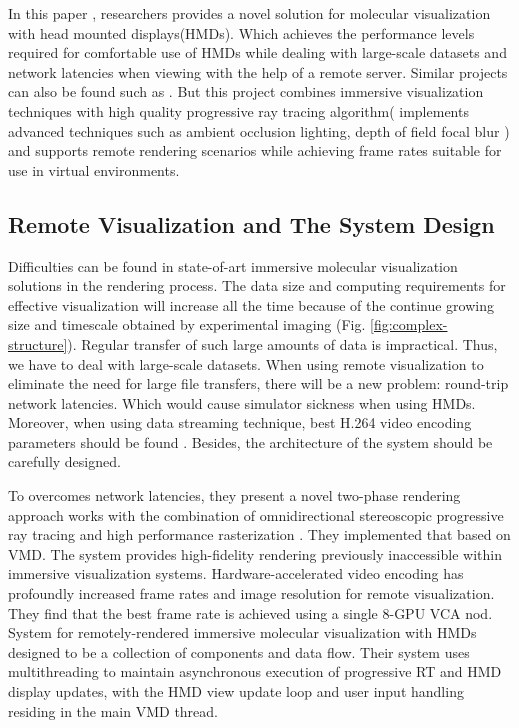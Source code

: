 \documentclass[10pt,twocolumn,letterpaper]{article}
\begin{document}
In this paper \cite{stone_immersive_2016}, researchers provides a novel solution for molecular visualization with head mounted displays(HMDs). Which achieves the performance levels required for comfortable use of HMDs while dealing with large-scale datasets and network latencies when viewing with the help of a remote server. Similar projects can also be found such as \cite{IMAX} \cite{Marsalek}. But this project combines immersive visualization techniques with high quality progressive ray tracing algorithm( implements advanced techniques such as ambient occlusion lighting, depth of field focal blur ) and supports remote rendering scenarios while achieving frame rates suitable for use in virtual environments. 

\subsection{Remote Visualization and The System Design}

Difficulties can be found in state-of-art immersive molecular visualization solutions in the rendering process. The data size and computing requirements for effective visualization will increase all the time because of the continue growing size and timescale obtained by experimental imaging (Fig. \ref{fig:complex-structure}). Regular transfer of such large amounts of data is impractical. Thus, we have to deal with large-scale datasets. When using remote visualization to eliminate the need for large file transfers, there will be a new problem: round-trip network latencies. Which would cause simulator sickness when using HMDs. Moreover, when using data streaming technique, best H.264 video encoding parameters should be found \cite{1218189}. Besides, the architecture of the system should be carefully designed.

To overcomes network latencies, they present a novel two-phase rendering approach works with the combination of omnidirectional stereoscopic progressive ray tracing and high performance rasterization \cite{hprsgpu}. They implemented that based on VMD. The system provides high-fidelity rendering previously inaccessible within immersive visualization systems. Hardware-accelerated video encoding has profoundly increased frame rates and image resolution for remote visualization. They find that the best frame rate is achieved using a single 8-GPU VCA nod. System for remotely-rendered immersive molecular visualization with HMDs designed to be a collection of components and data flow. Their system uses multithreading to maintain asynchronous execution of progressive RT and HMD display updates, with the HMD view update loop and user input handling residing in the main VMD thread.
\end{document}
